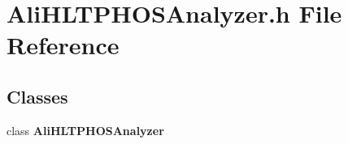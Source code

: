 \section{Ali\-HLTPHOSAnalyzer.h File Reference}
\label{AliHLTPHOSAnalyzer_8h}
\subsection*{Classes}
\begin{CompactItemize}
\item 
class {\bf Ali\-HLTPHOSAnalyzer}
\end{CompactItemize}
